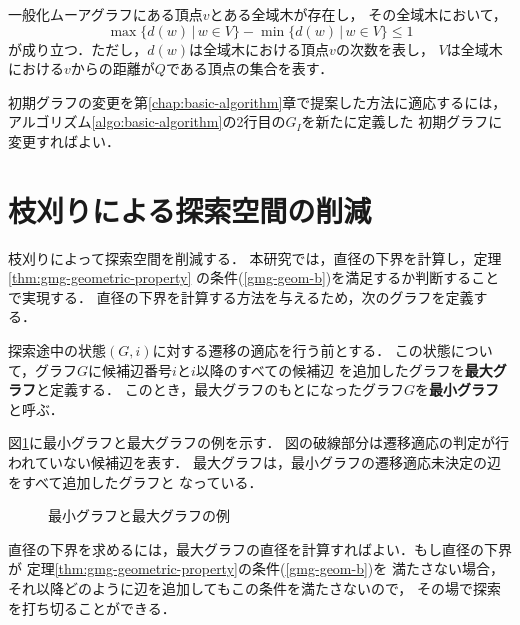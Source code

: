 \begin{conjecture}\rm
  \label{conj:spanning-tree-2}
  一般化ムーアグラフにある頂点$v$とある全域木が存在し，
  その全域木において，
  \[ \max\{d(w)\,|\,w\in V\}-\min\{d(w)\,|\,w\in V\}\leq 1 \]
  が成り立つ．ただし，$d(w)$は全域木における頂点$v$の次数を表し，
  $V$は全域木における$v$からの距離が$Q$である頂点の集合を表す．
\end{conjecture}

初期グラフの変更を第\ref{chap:basic-algorithm}章で提案した方法に適応するには，
アルゴリズム\ref{algo:basic-algorithm}の2行目の$G_I$を新たに定義した
初期グラフに変更すればよい．

\section{枝刈りによる探索空間の削減}
\label{sect:reduce-by-prune}
枝刈りによって探索空間を削減する．
本研究では，直径の下界を計算し，定理\ref{thm:gmg-geometric-property}
の条件(\ref{gmg-geom-b})を満足するか判断することで実現する．
直径の下界を計算する方法を与えるため，次のグラフを定義する．
\begin{definition}\rm
  探索途中の状態$(G,i)$に対する遷移の適応を行う前とする．
  この状態について，グラフ$G$に候補辺番号$i$と$i$以降のすべての候補辺
  を追加したグラフを\textbf{最大グラフ}と定義する．
  このとき，最大グラフのもとになったグラフ$G$を\textbf{最小グラフ}と呼ぶ．
\end{definition}

\begin{example}\rm
  図\ref{fig:min-max-graph}に最小グラフと最大グラフの例を示す．
  図の破線部分は遷移適応の判定が行われていない候補辺を表す．
  最大グラフは，最小グラフの遷移適応未決定の辺をすべて追加したグラフと
  なっている．
\end{example}

\begin{figure}
  \centering
  \hfill
  \caption{最小グラフと最大グラフの例}
  \label{fig:min-max-graph}
\end{figure}

直径の下界を求めるには，最大グラフの直径を計算すればよい．もし直径の下界が
定理\ref{thm:gmg-geometric-property}の条件(\ref{gmg-geom-b})を
満たさない場合，それ以降どのように辺を追加してもこの条件を満たさないので，
その場で探索を打ち切ることができる．

